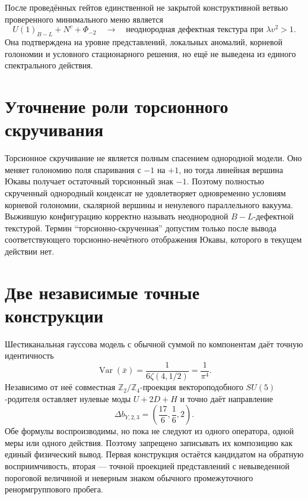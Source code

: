 \begin{proposition}
После проведённых гейтов единственной не закрытой конструктивной ветвью
проверенного минимального меню является
\begin{equation}
 U(1)_{B-L}+N^c+\Phi_{-2}
 \quad\longrightarrow\quad
 \text{неоднородная дефектная текстура при }\lambda v^2>1.
\end{equation}
Она подтверждена на уровне представлений, локальных аномалий, корневой
голономии и условного стационарного решения, но ещё не выведена из единого
спектрального действия.
\end{proposition}

\section{Уточнение роли торсионного скручивания}

Торсионное скручивание не является полным спасением однородной модели.
Оно меняет голономию поля спаривания с \(-1\) на \(+1\), но тогда линейная
вершина Юкавы получает остаточный торсионный знак \(-1\). Поэтому полностью
скрученный однородный конденсат не удовлетворяет одновременно условиям
корневой голономии, скалярной вершины и ненулевого параллельного вакуума.
Выжившую конфигурацию корректно называть неоднородной \(B-L\)-дефектной
текстурой. Термин ``торсионно-скрученная'' допустим только после вывода
соответствующего торсионно-нечётного отображения Юкавы, которого в текущем
действии нет.

\section{Две независимые точные конструкции}

Шестиканальная гауссова модель с обычной суммой по компонентам даёт точную
идентичность
\begin{equation}
 \operatorname{Var}(\bar x)
 =\frac{1}{6\zeta(4,1/2)}
 =\frac{1}{\pi^4}.
\end{equation}
Независимо от неё совместная \(\mathbb Z_2/\mathbb Z_4\)-проекция
вектороподобного \(SU(5)\)-родителя оставляет нулевые моды
\(U+2D+H\) и точно даёт направление
\begin{equation}
 \Delta b_{Y,2,3}=\left(\frac{17}{6},\frac16,2\right).
\end{equation}
Обе формулы воспроизводимы, но пока не следуют из одного оператора, одной
меры или одного действия. Поэтому запрещено записывать их композицию как
единый физический вывод. Первая конструкция остаётся кандидатом на
обратную восприимчивость, вторая --- точной проекцией представлений с
невыведенной пороговой величиной и неверным знаком обычного промежуточного
ренормгруппового пробега.

